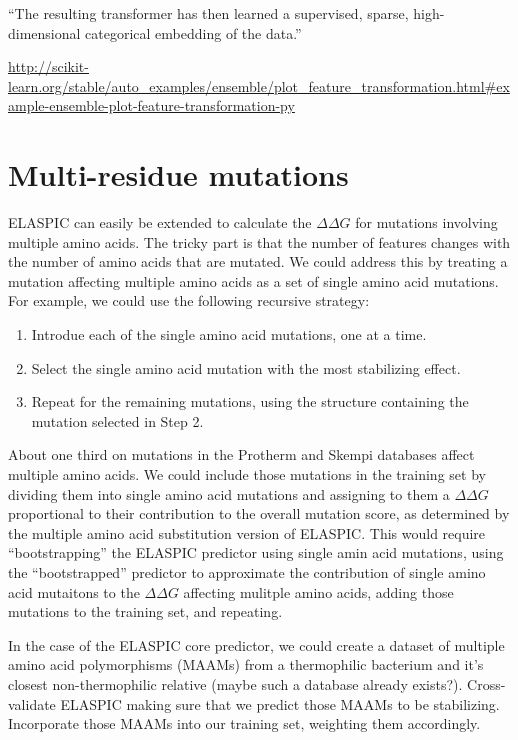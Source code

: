 ``The resulting transformer has then learned a supervised, sparse, high-dimensional categorical embedding of the data.''

\url{http://scikit-learn.org/stable/auto_examples/ensemble/plot_feature_transformation.html#example-ensemble-plot-feature-transformation-py}



\section{Multi-residue mutations}

ELASPIC can easily be extended to calculate the $\Delta \Delta G$ for mutations involving multiple amino acids. The tricky part is that the number of features changes with the number of amino acids that are mutated. We could address this by treating a mutation affecting multiple amino acids as a set of single amino acid mutations. For example, we could use the following recursive strategy:

\begin{enumerate}
    \item Introdue each of the single amino acid mutations, one at a time.
    \item Select the single amino acid mutation with the most stabilizing effect.
    \item Repeat for the remaining mutations, using the structure containing the mutation selected in Step 2.
\end{enumerate}

About one third on mutations in the Protherm and Skempi databases affect multiple amino acids. We could include those mutations in the training set by dividing them into single amino acid mutations and assigning to them a $\Delta \Delta G$ proportional to their contribution to the overall mutation score, as determined by the multiple amino acid substitution version of ELASPIC. This would require ``bootstrapping'' the ELASPIC predictor using single amin acid mutations, using the ``bootstrapped'' predictor to approximate the contribution of single amino acid mutaitons to the $\Delta \Delta G$ affecting mulitple amino acids, adding those mutations to the training set, and repeating.

In the case of the ELASPIC core predictor, we could create a dataset of multiple amino acid polymorphisms (MAAMs) from a thermophilic bacterium and it's closest non-thermophilic relative (maybe such a database already exists?). Cross-validate ELASPIC making sure that we predict those MAAMs to be stabilizing. Incorporate those MAAMs into our training set, weighting them accordingly.

